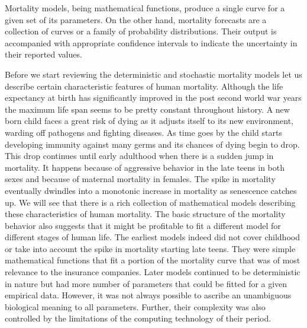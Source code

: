 \documentclass{article}
\numberwithin{equation}{section}
\begin{document}
Mortality models, being mathematical functions, produce a single curve for
a given set of its parameters. On the other hand, mortality forecasts are a
collection of curves or a family of probability distributions. Their output
is accompanied with appropriate confidence intervals to indicate the 
uncertainty in their reported values.

Before we start reviewing the deterministic and stochastic mortality models
let us describe certain characteristic features of human mortality. Although
the life expectancy at birth has significantly improved in the post second
world war years the maximum life span seems to be pretty constant throughout 
history. A new born child faces a great risk of dying as it adjusts itself
to its new environment, warding off pathogens and fighting diseases. As time 
goes by the child starts developing immunity against many germs and its
chances of dying begin to drop. This drop continues until early adulthood 
when there is a sudden jump in mortality. It happens because of aggressive
behavior in the late teens in both sexes and because of maternal mortality
in females. The spike in mortality eventually dwindles into a monotonic
increase in mortality as senescence catches up. We will see that there is 
a rich collection of mathematical models describing these characteristics
of human mortality. The basic structure of the mortality behavior also
suggests that it might be profitable to fit a different model for different
stages of human life. The earliest models indeed did not cover childhood or
take into account the spike in mortality starting late teens. They were 
simple mathematical functions that fit a portion of the mortality curve that
was of most relevance to the insurance companies. Later models continued to
be deterministic in nature but had more number of parameters that could be
fitted for a given empirical data. However, it was not always possible to 
ascribe an unambiguous biological meaning to all parameters. Further, their
complexity was also controlled by the limitations of the computing technology
of their period.
\end{document}
